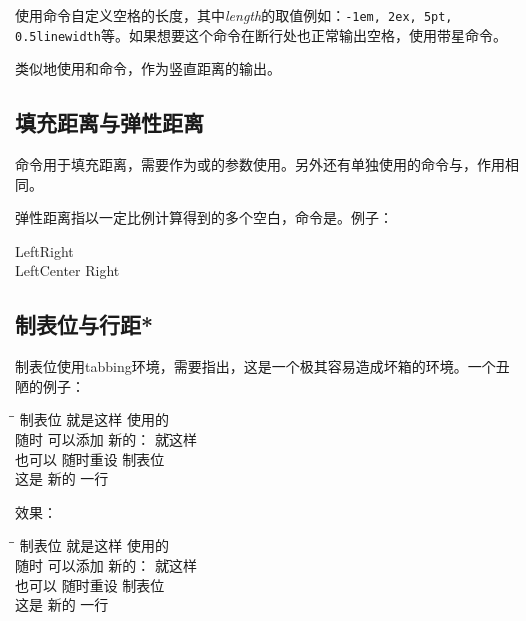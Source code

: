使用\latexline{\\hspace{length}}命令自定义空格的长度，其中\textit{length}的取值例如：\texttt{-1em, 2ex, 5pt, 0.5linewidth}等。如果想要这个命令在断行处也正常输出空格，使用带星命令\latexline{\\hspace*}。

类似地使用\latexline{\\vspace}和\latexline{\\vspace*}命令，作为竖直距离的输出。

\subsection{填充距离与弹性距离}
命令\latexline{\\fill}用于填充距离，需要作为\latexline{\\hspace}或\latexline{\\vspace}的参数使用。另外还有单独使用的命令\latexline{\\hfill}与\latexline{\\vfill}，作用相同。

弹性距离指以一定比例计算得到的多个空白，命令是\latexline{\\stretch}。例子：

\begin{codeshow}
Left\hspace{\fill}Right\\
LeftCenter
Right
\end{codeshow}

\subsection{制表位与行距*}
制表位使用tabbing环境，需要指出，这是一个极其容易造成坏箱的环境。一个丑陋的例子：
\begin{latex}{}
\begin{tabbing}
\hspace{4em}\=\hspace{8em}\=\kill
制表位 \> 就是这样 \> 使用的 \\
随时 \> 可以添加 \> 新的： \= 就这样 \\
也可以 \= 随时重设 \= 制表位 \\
这是 \> 新的 \> 一行
\end{tabbing}
\end{latex}

效果：
\begin{tabbing}
\hspace{4em}\=\hspace{8em}\=\kill
制表位 \> 就是这样 \> 使用的 \\
随时 \> 可以添加 \> 新的： \= 就这样 \\
也可以 \= 随时重设 \= 制表位 \\
这是 \> 新的 \> 一行
\end{tabbing}

